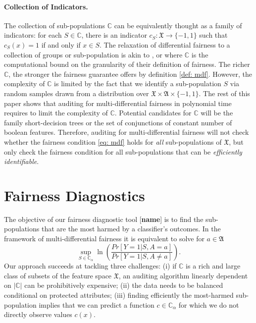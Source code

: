 \documentclass{article}
\begin{document}
\paragraph{Collection of Indicators.}
The collection of sub-populations $\mathbb{C}$ can be equivalently thought as a family of indicators: for each $S\in \mathbb{C}$, there is an indicator $c_{S}: \mathfrak{X}\rightarrow \{-1, 1\}$ such that $c_{S}(x)=1$ if and only if $x\in S$. The relaxation of differential fairness to a collection of groups or sub-population is akin to \cite{kim2018fairness}, \cite{kearns2017preventing} or \cite{hebert2017calibration} where $\mathbb{C}$ is the computational bound on the granularity of their definition of fairness. The richer $\mathbb{C}$, the stronger the fairness guarantee offers by definition \ref{def: mdf}. However, the complexity of $\mathbb{C}$ is limited by the fact that we identify a sub-population $S$ via random samples drawn from a distribution over $\mathfrak{X} \times \mathfrak{A}\times \{-1, 1\}$. The rest of this paper shows that auditing for multi-differential fairness in polynomial time requires to limit the complexity of $\mathbb{C}$. Potential candidates for $\mathbb{C}$ will be the family short-decision trees or the set of conjunctions of constant number of boolean features. Therefore, auditing for multi-differential fairness will not check whether the fairness condition \eqref{eq: mdf} holds for \textit{all} sub-populations of $\mathfrak{X}$, but only check  the fairness condition for all sub-populations that can be \textit{efficiently identifiable}. 


\section{Fairness Diagnostics}

The objective of our fairness diagnostic tool [\textbf{name}] is to find the sub-populations that are the most harmed by a classifier's outcomes. In the framework of multi-differential fairness it is equivalent to solve for $a\in \mathfrak{A}$
\begin{equation}
\label{eq: wvio}
\sup_{S\in \mathbb{C}_{\alpha}}\ln\left(\frac{Pr[Y=1|S, A=a]}{Pr[Y=1|S, A\neq a]}\right).
\end{equation}
Our approach succeeds at tackling three challenges: (i) if $\mathbb{C}$ is a rich and large class of subsets of the feature space $\mathfrak{X}$, an auditing algorithm linearly dependent on $|\mathbb{C}|$ can be prohibitively expensive; (ii) the data needs to be balanced conditional on protected attributes; (iii) finding efficiently the most-harmed sub-population implies that we can predict a function $c\in \mathbb{C}_{\alpha}$ for which we do not directly observe values $c(x)$. 
 
\end{document}
